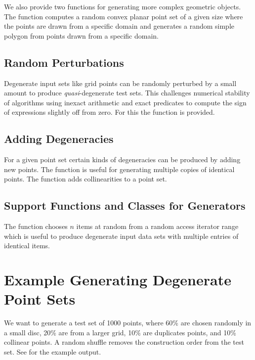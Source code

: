 We also provide two functions for generating more complex geometric objects.
The function  computes a random convex planar
point set of a given size where the points are drawn from a specific
domain and  generates a random simple polygon from
points drawn from a specific domain.  

\subsection{Random Perturbations}

Degenerate input sets like grid points can be randomly perturbed by a
small amount to produce {\em quasi}-degenerate test sets. This
challenges numerical stability of algorithms using inexact arithmetic and
exact predicates to compute the sign of expressions slightly off from zero.
For this the function  is provided.

\subsection{Adding Degeneracies}
\ccModifierCrossRefOff
{}
\ccModifierCrossRefOn

For a given point set certain kinds of degeneracies can be produced
by adding new points. The  function is
useful for generating multiple copies of identical points.
The function  adds collinearities to
a point set.

\subsection{Support Functions and Classes for Generators}

The function  chooses $n$ items at random from a random
access iterator range which is useful to produce degenerate input data
sets with multiple entries of identical items.

\section{Example Generating Degenerate Point Sets}

We want to generate a test set of 1000 points, where 60\% are chosen
randomly in a small disc, 20\% are from a larger grid, 10\% are duplicates
points, and 10\% collinear points. A random shuffle removes the
construction order from the test set. See 
for the example output.

